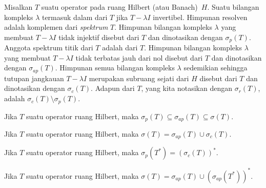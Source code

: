 \begin{defn} Misalkan $T$ suatu operator pada ruang Hilbert (atau Banach)~$H$. Suatu bilangan kompleks $\lambda$ termasuk dalam
 dari $T$ jika $T - \lambda I$ invertibel. Himpunan resolven adalah komplemen dari \emph{spektrum}
$T$. Himpunan bilangan kompleks $\lambda$ yang membuat $T - \lambda I$ tidak injektif disebut
 dari $T$ dan dinotasikan
dengan $\sigma_p(T)$. Anggota spektrum titik dari $T$ adalah
 dari $T$. Himpunan bilangan kompleks $\lambda$ yang membuat $T - \lambda I$ tidak terbatas jauh dari nol disebut
 dari $T$ dan dinotasikan
dengan $\sigma_{ap}(T)$. Himpunan semua bilangan kompleks $\lambda$ sedemikian sehingga tutupan jangkauan $T - \lambda I$ merupakan subruang
sejati dari $H$ disebut
 dari $T$ dan dinotasikan
dengan $\sigma_c(T)$. Adapun
 dari $T$, yang kita notasikan
dengan $\sigma_r(T)$, adalah $\sigma_c(T) \setminus \sigma_p(T)$.
\end{defn}

\begin{prop} Jika $T$ suatu operator ruang Hilbert, maka $\sigma_p(T) \subseteq \sigma_{ap}(T) \subseteq \sigma(T)$.
\end{prop}

\begin{prop} Jika $T$ suatu operator ruang Hilbert, maka $\sigma(T) = \sigma_{ap}(T) \cup \sigma_c(T)$.
\end{prop}

\begin{prop} Jika $T$ suatu operator ruang Hilbert, maka $\sigma_p(T^*) = (\sigma_c(T))^*$.
\end{prop}

\begin{cor} Jika $T$ suatu operator ruang Hilbert, maka $\sigma(T) = \sigma_{ap}(T) \cup (\sigma_{ap}(T^*))^*$.
\end{cor}

